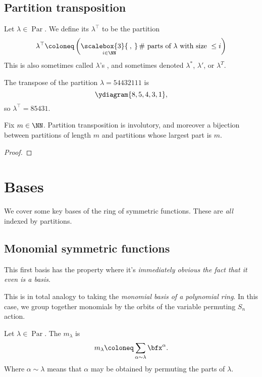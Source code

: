 \documentclass{article}
\newcommand{\bigcomma}{\ensuremath{\mathop{\scalebox{3}{\:,\:}}\limits}}
\DeclareMathOperator{\Par}{Par}
\begin{document}
\subsection{Partition transposition}

\begin{definition}
    Let $\lambda \in \Par$.
    We define its  $\lambda^\top$ to be the partition
    \[
        \lambda^\top
        \coloneq
        \left(
            \bigcomma_{i \in \NN}
            \# \text{ parts of }\lambda\text{ with size }\leq i
        \right)
    \]
    This is also sometimes called $\lambda$'s , and sometimes denoted $\lambda^\ast$, $\lambda'$, or $\lambda^T$.
\end{definition}

\begin{example}
    The transpose of the partition $\lambda = 54432111$ is
    \[
        \ydiagram{8,5,4,3,1},
    \]
    so $\lambda^\top = 85431$.
\end{example}

\begin{proposition}
    Fix $m \in \NN$.
    Partition transposition is involutory, and moreover a bijection between partitions of length $m$ and partitions whose largest part is $m$.
\end{proposition}

\begin{proof}
\end{proof}

\section{Bases}

We cover some key bases of the ring of symmetric functions. These are \textit{all} indexed by partitions.

\subsection{Monomial symmetric functions}

This first basis has the property where it's \textit{immediately obvious the fact that it even is a basis}.

This is in total analogy to taking the \textit{monomial basis of a polynomial ring}. In this case, we group together monomials by the orbits of the variable permuting $S_n$ action.

\begin{definition}
    Let $\lambda \in \Par$. The  $m_\lambda$ is 
    \[
        m_\lambda \coloneq \sum_{\alpha \sim \lambda} \bfx^\alpha.
    \]
    Where $\alpha \sim \lambda$ means that $\alpha$ may be obtained by permuting the parts of $\lambda$.
\end{definition}
\end{document}
